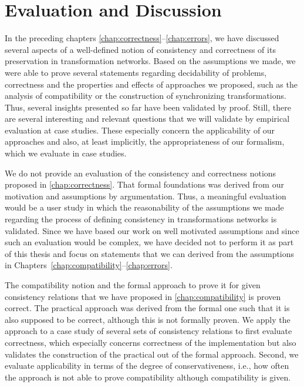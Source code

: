 \chapter{Evaluation and Discussion 
}
\label{chap:correctness_evaluation}

In the preceding chapters \ref{chap:correctness}--\ref{chap:errors}, we have discussed several aspects of a well-defined notion of consistency and correctness of its preservation in transformation networks.
Based on the assumptions we made, we were able to prove several statements regarding decidability of problems, correctness and the properties and effects of approaches we proposed, such as the analysis of compatibility or the construction of synchronizing transformations.
Thus, several insights presented so far have been validated by proof.
Still, there are several interesting and relevant questions that we will validate by empirical evaluation at case studies.
These especially concern the applicability of our approaches and also, at least implicitly, the appropriateness of our formalism, which we evaluate in case studies.

We do not provide an evaluation of the consistency and correctness notions proposed in \autoref{chap:correctness}.
That formal foundations was derived from our motivation and assumptions by argumentation.
Thus, a meaningful evaluation would be a user study in which the reasonability of the assumptions we made regarding the process of defining consistency in transformations networks is validated.
Since we have based our work on well motivated assumptions and since such an evaluation would be complex, we have decided not to perform it as part of this thesis and focus on statements that we can derived from the assumptions in Chapters~\ref{chap:compatibility}--\ref{chap:errors}.

The compatibility notion and the formal approach to prove it for given consistency relations that we have proposed in \autoref{chap:compatibility} is proven correct.
The practical approach was derived from the formal one such that it is also supposed to be correct, although this is not formally proven.
We apply the approach to a case study of several sets of consistency relations to first evaluate correctness, which especially concerns correctness of the implementation but also validates the construction of the practical out of the formal approach.
Second, we evaluate applicability in terms of the degree of conservativeness, i.e., how often the approach is not able to prove compatibility although compatibility is given.

